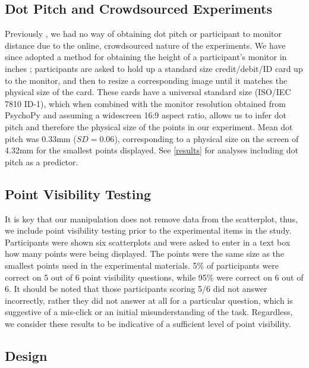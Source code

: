 \documentclass{vgtc}                          %
\begin{document}
\hypertarget{dot-pitch-and-crowdsourced-experiments}{%
\subsection{Dot Pitch and Crowdsourced Experiments}\label{dot-pitch-and-crowdsourced-experiments}}

Previously \cite{strain_2023}, we had no way of obtaining dot pitch
or participant to monitor distance due to the online, crowdsourced nature of the
experiments. We have since adopted a method for obtaining the height of a
participant's monitor in inches \cite{screenscale}; participants are asked to hold up a standard size
credit/debit/ID card up to the monitor, and then to resize a corresponding image until
it matches the physical size of the card. These cards have a universal
standard size (ISO/IEC 7810 ID-1), which when combined with
the monitor resolution obtained from PsychoPy \cite{pierce_psychopy_2019}
and assuming a widescreen 16:9 aspect ratio,
allows us to infer dot pitch and therefore the physical size of the points in our
experiment. Mean dot pitch was 0.33mm (\(SD = 0.06\)),
corresponding to a physical size on the screen of 4.32mm
for the smallest points displayed. See \autoref{results} for analyses including dot pitch as a predictor.

\hypertarget{point-visibility-testing}{%
\subsection{Point Visibility Testing}\label{point-visibility-testing}}

It is key that our manipulation does not remove data from the scatterplot,
thus, we include point visibility testing prior to the experimental items in the study.
Participants were shown six scatterplots
and were asked to enter in a text box how many points
were being displayed. The points were the same size as the smallest points used
in the experimental materials. 5\% of
participants were correct on 5 out of 6 point
visibility questions, while 95\% were correct
on 6 out of 6. It should be noted that those
participants scoring 5/6 did not answer incorrectly, rather they did not answer
at all for a particular question, which is suggestive of
a mis-click or an initial misunderstanding of the task. Regardless,
we consider these results to be indicative of a sufficient level of
point visibility.

\hypertarget{design}{%
\subsection{Design}\label{design}}
\end{document}
